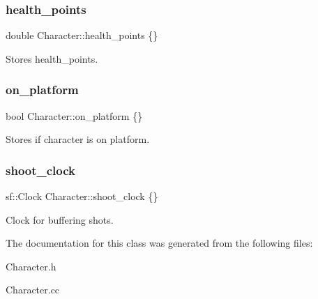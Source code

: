 \subsubsection{\texorpdfstring{health\+\_\+points}{health\_points}}
{\footnotesize\ttfamily double Character\+::health\+\_\+points \{\}\hspace{0.3cm}{\ttfamily [protected]}}

Stores health\+\_\+points. \mbox{\label{classCharacter_a5706469de2945e3ce0a39ff1df4c50d9}} 
\subsubsection{\texorpdfstring{on\+\_\+platform}{on\_platform}}
{\footnotesize\ttfamily bool Character\+::on\+\_\+platform \{\}\hspace{0.3cm}{\ttfamily [protected]}}

Stores if character is on platform. \mbox{\label{classCharacter_a93214fb7df7c0b20366a50dacdd03a49}} 
\subsubsection{\texorpdfstring{shoot\+\_\+clock}{shoot\_clock}}
{\footnotesize\ttfamily sf\+::\+Clock Character\+::shoot\+\_\+clock \{\}\hspace{0.3cm}{\ttfamily [protected]}}

Clock for buffering shots. 

The documentation for this class was generated from the following files\+:\begin{DoxyCompactItemize}
\item 
Character.\+h\item 
Character.\+cc\end{DoxyCompactItemize}
